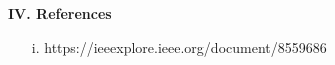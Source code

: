 \documentclass[12pt]{article}
\begin{document}
	\begin{flushleft}
		\Large\textbf{IV. References}
	\end{flushleft}
		\begin{enumerate}
			\item[i.] https://ieeexplore.ieee.org/document/8559686
		\end{enumerate}
	
		
	
		
		
	
\end{document}

